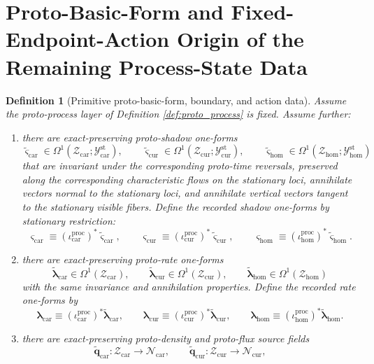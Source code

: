\documentclass[11pt]{article}
\newcommand{\TensorStatTagClass}{\mathcal Y_{\mathrm{car}}^{\mathrm{st}}}
\newcommand{\CurStatTagClass}{\mathcal Y_{\mathrm{cur}}^{\mathrm{st}}}
\newcommand{\HomStatTagClass}{\mathcal Y_{\mathrm{hom}}^{\mathrm{st}}}
\newcommand{\TensorDensityClass}{\mathscr N_{\mathrm{car}}}
\newcommand{\CurDensityClass}{\mathscr N_{\mathrm{cur}}}
\newcommand{\TensorShadowForm}{\boldsymbol{\varsigma}_{\mathrm{car}}}
\newcommand{\CurShadowForm}{\boldsymbol{\varsigma}_{\mathrm{cur}}}
\newcommand{\HomShadowForm}{\boldsymbol{\varsigma}_{\mathrm{hom}}}
\newcommand{\TensorRateForm}{\boldsymbol{\lambda}_{\mathrm{car}}}
\newcommand{\CurRateForm}{\boldsymbol{\lambda}_{\mathrm{cur}}}
\newcommand{\HomRateForm}{\boldsymbol{\lambda}_{\mathrm{hom}}}
\newcommand{\TensorProtoSpace}{\mathcal Z_{\mathrm{car}}}
\newcommand{\CurProtoSpace}{\mathcal Z_{\mathrm{cur}}}
\newcommand{\HomProtoSpace}{\mathcal Z_{\mathrm{hom}}}
\newcommand{\TensorProcInc}{\iota_{\mathrm{car}}^{\mathrm{proc}}}
\newcommand{\CurProcInc}{\iota_{\mathrm{cur}}^{\mathrm{proc}}}
\newcommand{\HomProcInc}{\iota_{\mathrm{hom}}^{\mathrm{proc}}}
\newcommand{\TensorProtoShadowForm}{\widetilde{\boldsymbol{\varsigma}}_{\mathrm{car}}}
\newcommand{\CurProtoShadowForm}{\widetilde{\boldsymbol{\varsigma}}_{\mathrm{cur}}}
\newcommand{\HomProtoShadowForm}{\widetilde{\boldsymbol{\varsigma}}_{\mathrm{hom}}}
\newcommand{\TensorProtoRateForm}{\widetilde{\boldsymbol{\lambda}}_{\mathrm{car}}}
\newcommand{\CurProtoRateForm}{\widetilde{\boldsymbol{\lambda}}_{\mathrm{cur}}}
\newcommand{\HomProtoRateForm}{\widetilde{\boldsymbol{\lambda}}_{\mathrm{hom}}}
\newcommand{\TensorProtoDensitySource}{\widetilde{\boldsymbol q}_{\mathrm{car}}}
\newcommand{\CurProtoDensitySource}{\widetilde{\boldsymbol q}_{\mathrm{cur}}}
\newtheorem{definition}{Definition}
\begin{document}
\section{Proto-Basic-Form and Fixed-Endpoint-Action Origin of the Remaining Process-State Data}

\begin{definition}[Primitive proto-basic-form, boundary, and action data]
\label{def:proto_basic}
Assume the proto-process layer of Definition \ref{def:proto_process} is fixed. Assume further:
\begin{enumerate}
    \item there are exact-preserving proto-shadow one-forms
    \[
    \TensorProtoShadowForm\in\Omega^1(\TensorProtoSpace;\TensorStatTagClass),\qquad
    \CurProtoShadowForm\in\Omega^1(\CurProtoSpace;\CurStatTagClass),\qquad
    \HomProtoShadowForm\in\Omega^1(\HomProtoSpace;\HomStatTagClass)
    \]
    that are invariant under the corresponding proto-time reversals, preserved along the corresponding characteristic flows on the stationary loci, annihilate vectors normal to the stationary loci, and annihilate vertical vectors tangent to the stationary visible fibers. Define the recorded shadow one-forms by stationary restriction:
    \begin{equation}
    \TensorShadowForm\equiv (\TensorProcInc)^*\TensorProtoShadowForm,\qquad
    \CurShadowForm\equiv (\CurProcInc)^*\CurProtoShadowForm,\qquad
    \HomShadowForm\equiv (\HomProcInc)^*\HomProtoShadowForm.
    \label{eq:shadow_restriction}
    \end{equation}
    \item there are exact-preserving proto-rate one-forms
    \[
    \TensorProtoRateForm\in\Omega^1(\TensorProtoSpace),\qquad
    \CurProtoRateForm\in\Omega^1(\CurProtoSpace),\qquad
    \HomProtoRateForm\in\Omega^1(\HomProtoSpace)
    \]
    with the same invariance and annihilation properties. Define the recorded rate one-forms by
    \begin{equation}
    \TensorRateForm\equiv (\TensorProcInc)^*\TensorProtoRateForm,\qquad
    \CurRateForm\equiv (\CurProcInc)^*\CurProtoRateForm,\qquad
    \HomRateForm\equiv (\HomProcInc)^*\HomProtoRateForm.
    \label{eq:rate_restriction}
    \end{equation}
    \item there are exact-preserving proto-density and proto-flux source fields
    \[
    \TensorProtoDensitySource:\TensorProtoSpace\to\TensorDensityClass,\qquad
    \CurProtoDensitySource:\CurProtoSpace\to\CurDensityClass,\qquad
\]
\end{enumerate}
\end{definition}
\end{document}
